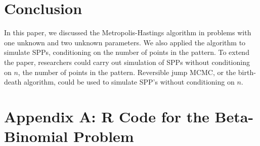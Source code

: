 \documentclass[12pt,openany]{article}
\theoremstyle{remark} %
\theoremstyle{definition} %
\begin{document}
\newpage
\section{Conclusion}
In this paper, we discussed the Metropolis-Hastings algorithm in problems with one unknown and two unknown parameters. We also applied the algorithm to simulate SPPs, conditioning on the number of points in the pattern. To extend the paper, researchers could carry out simulation of SPPs without conditioning on $n$, the number of points in the pattern. Reversible jump MCMC, or the birth-death algorithm, could be used to simulate SPP's without conditioning on $n$.
\section{Appendix A: \textsf{R} Code for the Beta-Binomial Problem}
\end{document}
